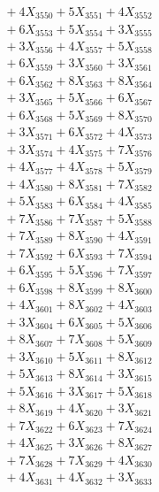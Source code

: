 \documentclass[a4paper,10pt]{article}
\begin{document}
{\begin{align}
&\;  + 4 X_{3550} + 5 X_{3551} + 4 X_{3552} \\[0.3ex]
&\;  + 6 X_{3553} + 5 X_{3554} + 3 X_{3555} \\[0.3ex]
&\;  + 3 X_{3556} + 4 X_{3557} + 5 X_{3558} \\[0.3ex]
&\;  + 6 X_{3559} + 3 X_{3560} + 3 X_{3561} \\[0.3ex]
&\;  + 6 X_{3562} + 8 X_{3563} + 8 X_{3564} \\[0.3ex]
&\;  + 3 X_{3565} + 5 X_{3566} + 6 X_{3567} \\[0.3ex]
&\;  + 6 X_{3568} + 5 X_{3569} + 8 X_{3570} \\[0.3ex]
&\;  + 3 X_{3571} + 6 X_{3572} + 4 X_{3573} \\[0.3ex]
&\;  + 3 X_{3574} + 4 X_{3575} + 7 X_{3576} \\[0.3ex]
&\;  + 4 X_{3577} + 4 X_{3578} + 5 X_{3579} \\[0.5ex]\allowbreak
&\;  + 4 X_{3580} + 8 X_{3581} + 7 X_{3582} \\[0.3ex]
&\;  + 5 X_{3583} + 6 X_{3584} + 4 X_{3585} \\[0.3ex]
&\;  + 7 X_{3586} + 7 X_{3587} + 5 X_{3588} \\[0.3ex]
&\;  + 7 X_{3589} + 8 X_{3590} + 4 X_{3591} \\[0.3ex]
&\;  + 7 X_{3592} + 6 X_{3593} + 7 X_{3594} \\[0.3ex]
&\;  + 6 X_{3595} + 5 X_{3596} + 7 X_{3597} \\[0.3ex]
&\;  + 6 X_{3598} + 8 X_{3599} + 8 X_{3600} \\[0.3ex]
&\;  + 4 X_{3601} + 8 X_{3602} + 4 X_{3603} \\[0.3ex]
&\;  + 3 X_{3604} + 6 X_{3605} + 5 X_{3606} \\[0.3ex]
&\;  + 8 X_{3607} + 7 X_{3608} + 5 X_{3609} \\[0.5ex]\allowbreak
&\;  + 3 X_{3610} + 5 X_{3611} + 8 X_{3612} \\[0.3ex]
&\;  + 5 X_{3613} + 8 X_{3614} + 3 X_{3615} \\[0.3ex]
&\;  + 5 X_{3616} + 3 X_{3617} + 5 X_{3618} \\[0.3ex]
&\;  + 8 X_{3619} + 4 X_{3620} + 3 X_{3621} \\[0.3ex]
&\;  + 7 X_{3622} + 6 X_{3623} + 7 X_{3624} \\[0.3ex]
&\;  + 4 X_{3625} + 3 X_{3626} + 8 X_{3627} \\[0.3ex]
&\;  + 7 X_{3628} + 7 X_{3629} + 4 X_{3630} \\[0.3ex]
&\;  + 4 X_{3631} + 4 X_{3632} + 3 X_{3633} \\[0.3ex]

\end{align}}
\end{document}
